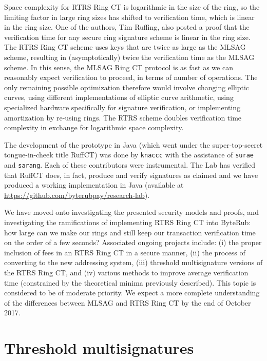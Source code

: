 \documentclass[12pt,english]{mrl}
\theoremstyle{definition}
\numberwithin{equation}{section}
\numberwithin{figure}{section}
\numberwithin{equation}{section}
\numberwithin{equation}{section}
\numberwithin{figure}{section}
\begin{document}
Space complexity for RTRS Ring CT is logarithmic in the size of the ring, so the limiting factor in large ring sizes has shifted to verification time, which is linear in the ring size. One of the authors, Tim Ruffing, also posted a proof that the verification time for any secure ring signature scheme is linear in the ring size. The RTRS Ring CT scheme uses keys that are twice as large as the MLSAG scheme, resulting in (asymptotically) twice the verification time as the MLSAG scheme. In this sense, the MLSAG Ring CT protocol is as fast as we can reasonably expect verification to proceed, in terms of number of operations. The only remaining possible optimization therefore would involve changing elliptic curves, using different implementations of elliptic curve arithmetic, using specialized hardware specifically for signature verification, or implementing amortization by re-using rings. The RTRS scheme doubles verification time complexity in exchange for logarithmic space complexity.

The development of the prototype in Java (which went under the super-top-secret tongue-in-cheek title RuffCT) was done by \texttt{knaccc} with the assistance of \texttt{surae} and \texttt{sarang}. Each of these contributors were instrumental. The Lab has verified that RuffCT does, in fact, produce and verify signatures as claimed and we have produced a working implementation in Java (available at \url{https://github.com/byterubpay/research-lab}). 

We have moved onto investigating the presented security models and proofs, and investigating the ramifications of implementing RTRS Ring CT into ByteRub: how large can we make our rings and still keep our transaction verification time on the order of a few seconds? Associated ongoing projects include: (i) the proper inclusion of fees in an RTRS Ring CT in a secure manner, (ii) the process of converting to the new addressing system, (iii) threshold multisignature versions of the RTRS Ring CT, and (iv) various methods to improve average verification time (constrained by the theoretical minima previously described). This topic is considered to be of moderate priority. We expect a more complete understanding of the differences between MLSAG and RTRS Ring CT by the end of October 2017.








\section{Threshold multisignatures} 
\end{document}
